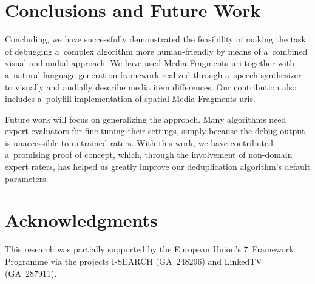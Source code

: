 \documentclass{article}
\begin{document}

\section{Conclusions and Future Work}
\label{sec:conclusions-and-future-work}
Concluding, we have successfully demonstrated the feasibility of making the task of debugging a~complex algorithm more human-friendly by means of a~combined visual and audial approach. We have used Media Fragments {\sc uri} together with a~natural language generation framework realized through a~speech synthesizer to visually and audially describe media item differences. Our contribution also includes a~polyfill implementation of spatial Media Fragments {\sc uri}s.

Future work will focus on generalizing the approach. Many algorithms need expert evaluators for fine-tuning their settings, simply because the debug output is unaccessible to untrained raters. With this work, we have contributed a~promising proof of concept, which, through the involvement of non-domain expert raters, has helped us greatly improve our deduplication algorithm's default parameters.


\section{Acknowledgments}
This research was partially supported by the European Union's 7~Framework Programme via the projects \mbox{I-SEARCH}
(GA~248296) and LinkedTV (GA~287911).


\begin{spacing}{0.96}


\end{spacing}
\end{document}
